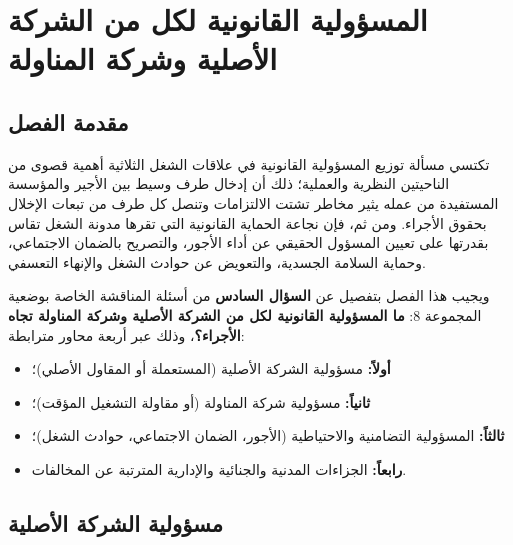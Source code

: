 
\chapter{المسؤولية القانونية لكل من الشركة الأصلية وشركة المناولة}
\label{chap:chapitre5}

\section*{مقدمة الفصل}

تكتسي مسألة توزيع المسؤولية القانونية في علاقات الشغل الثلاثية أهمية قصوى من الناحيتين النظرية والعملية؛ ذلك أن إدخال طرف وسيط بين الأجير والمؤسسة المستفيدة من عمله يثير مخاطر تشتت الالتزامات وتنصل كل طرف من تبعات الإخلال بحقوق الأجراء. ومن ثم، فإن نجاعة الحماية القانونية التي تقرها مدونة الشغل تقاس بقدرتها على تعيين المسؤول الحقيقي عن أداء الأجور، والتصريح بالضمان الاجتماعي، وحماية السلامة الجسدية، والتعويض عن حوادث الشغل والإنهاء التعسفي.

ويجيب هذا الفصل بتفصيل عن \textbf{السؤال السادس} من أسئلة المناقشة الخاصة بوضعية المجموعة \textenglish{8}: \textbf{ما المسؤولية القانونية لكل من الشركة الأصلية وشركة المناولة تجاه الأجراء؟}، وذلك عبر أربعة محاور مترابطة:
\begin{itemize}[leftmargin=*, itemsep=4pt]
    \item \textbf{أولاً:} مسؤولية الشركة الأصلية (المستعملة أو المقاول الأصلي)؛
    \item \textbf{ثانياً:} مسؤولية شركة المناولة (أو مقاولة التشغيل المؤقت)؛
    \item \textbf{ثالثاً:} المسؤولية التضامنية والاحتياطية (الأجور، الضمان الاجتماعي، حوادث الشغل)؛
    \item \textbf{رابعاً:} الجزاءات المدنية والجنائية والإدارية المترتبة عن المخالفات.
\end{itemize}

\section{مسؤولية الشركة الأصلية}

